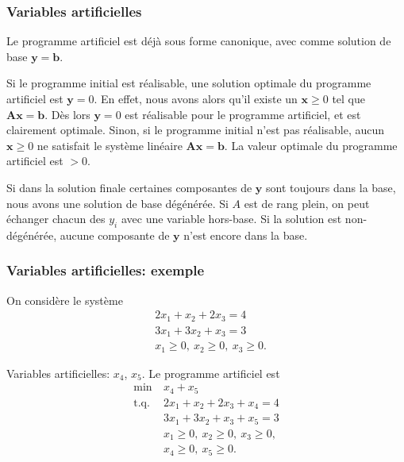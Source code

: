 \documentclass[usepdftitle=false]{beamer}
\def\bb{\boldsymbol{b}}
\def\bx{\boldsymbol{x}}
\def\by{\boldsymbol{y}}
\def\bA{\boldsymbol{A}}
\begin{document}
\begin{frame}
\frametitle{Variables artificielles}

Le programme artificiel est déjà sous forme canonique, avec comme solution de base $\by = \bb$.

\mbox{}

Si le programme initial est réalisable, une solution optimale du programme artificiel est $\by = 0$.
En effet, nous avons alors qu'il existe un $\bx \geq 0$ tel que $\bA\bx = \bb$. Dès lors $\by = 0$ est réalisable pour le programme artificiel, et est clairement optimale.
Sinon, si le programme initial n'est pas réalisable, aucun $\bx \geq 0$ ne satisfait le système linéaire $\bA \bx = \bb$.
La valeur optimale du programme artificiel est $> 0$.

\mbox{}

Si dans la solution finale certaines composantes de $\by$ sont toujours dans la base, nous avons une solution de base dégénérée. Si $A$ est de rang plein, on peut échanger chacun des $y_i$ avec une variable hors-base. Si la solution est non-dégénérée, aucune composante de $\by$ n'est encore dans la base.

\end{frame}

\begin{frame}
\frametitle{Variables artificielles: exemple}

On considère le système
\begin{align*}
& 2x_1 + x_2 + 2x_3 = 4 \\
& 3x_1 + 3x_2 + x_3 = 3 \\
& x_1 \geq 0,\ x_2 \geq 0,\ x_3 \geq 0.
\end{align*}

\mbox{}

Variables artificielles: $x_4$, $x_5$. Le programme artificiel est
\begin{align*}
\min\ & x_4 + x_5 \\
\mbox{t.q. }
& 2x_1 + x_2 + 2x_3 + x_4 = 4 \\
& 3x_1 + 3x_2 + x_3 + x_5 = 3 \\
& x_1 \geq 0,\ x_2 \geq 0,\ x_3 \geq 0, \\
& x_4 \geq 0,\ x_5 \geq 0.
\end{align*}

\end{frame}
\end{document}
